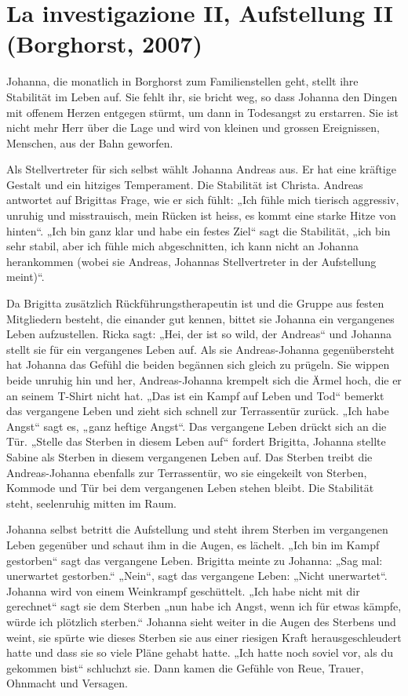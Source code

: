 \documentclass[10pt,titlepage,a5paper]{book}
\begin{document}
\section*{La investigazione II, Aufstellung II (Borghorst, 2007)}



Johanna, die monatlich in Borghorst zum Familienstellen geht, stellt ihre Stabilität im Leben auf. Sie fehlt ihr, sie bricht weg, so dass Johanna den Dingen mit offenem Herzen entgegen stürmt, um dann in Todesangst zu erstarren. Sie ist nicht mehr Herr über die Lage und wird von kleinen und grossen Ereignissen, Menschen, aus der Bahn geworfen.

Als Stellvertreter für sich selbst wählt Johanna Andreas aus. Er hat eine kräftige Gestalt und ein hitziges Temperament. Die Stabilität ist Christa. Andreas antwortet auf Brigittas Frage, wie er sich fühlt: „Ich fühle mich tierisch aggressiv, unruhig und misstrauisch, mein Rücken ist heiss, es kommt eine starke Hitze von hinten“. „Ich bin ganz klar und habe ein festes Ziel“ sagt die Stabilität, „ich bin sehr stabil, aber ich fühle mich abgeschnitten, ich kann nicht an Johanna herankommen (wobei sie Andreas, Johannas Stellvertreter in der Aufstellung meint)“.

Da Brigitta zusätzlich Rückführungstherapeutin ist und die Gruppe aus festen Mitgliedern besteht, die einander gut kennen, bittet sie Johanna ein vergangenes Leben aufzustellen. Ricka sagt: „Hei, der ist so wild, der Andreas“ und Johanna stellt sie für ein vergangenes Leben auf. Als sie Andreas-Johanna gegenübersteht hat Johanna das Gefühl die beiden begännen sich gleich zu prügeln. Sie wippen beide unruhig hin und her, Andreas-Johanna krempelt sich die Ärmel hoch, die er an seinem T-Shirt nicht hat. „Das ist ein Kampf auf Leben und Tod“ bemerkt das vergangene Leben und zieht sich schnell zur Terrassentür zurück. „Ich habe Angst“ sagt es, „ganz heftige Angst“. Das vergangene Leben drückt sich an die Tür. „Stelle das Sterben in diesem Leben auf“ fordert Brigitta, Johanna stellte Sabine als Sterben in diesem vergangenen Leben auf. Das Sterben treibt die Andreas-Johanna ebenfalls zur Terrassentür, wo sie eingekeilt von Sterben, Kommode und Tür bei dem vergangenen Leben stehen bleibt. Die Stabilität steht, seelenruhig mitten im Raum.

Johanna selbst betritt die Aufstellung und steht ihrem Sterben im vergangenen Leben gegenüber und schaut ihm in die Augen, es lächelt. „Ich bin im Kampf gestorben“ sagt das vergangene Leben. Brigitta meinte zu Johanna: „Sag mal: unerwartet gestorben.“ „Nein“, sagt das vergangene Leben: „Nicht unerwartet“. Johanna wird von einem Weinkrampf geschüttelt. „Ich habe nicht mit dir gerechnet“ sagt sie dem Sterben „nun habe ich Angst, wenn ich für etwas kämpfe, würde ich plötzlich sterben.“ Johanna sieht weiter in die Augen des Sterbens und weint, sie spürte wie dieses Sterben sie aus einer riesigen Kraft herausgeschleudert hatte und dass sie so viele Pläne gehabt hatte. „Ich hatte noch soviel vor, als du gekommen bist“ schluchzt sie. Dann kamen die Gefühle von Reue, Trauer, Ohnmacht und Versagen.
\end{document}
